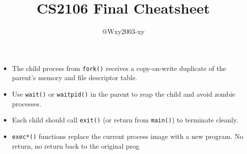 \documentclass[8pt,twocolumn]{article}
\begin{document}
\title{CS2106 Final Cheatsheet}
\author{@Wxy2003-xy}
\date{}
\maketitle
\begin{itemize}[leftmargin=2em]
    \setlength{\itemsep}{0pt} %
    \setlength{\parskip}{0pt}
    \item The child process from \texttt{fork()} receives a copy-on-write duplicate of the parent's memory and file descriptor table.
    \item Use \texttt{wait()} or \texttt{waitpid()} in the parent to reap the child and avoid zombie processes.
    \item Each child should call \texttt{exit()} (or return from \texttt{main()}) to terminate cleanly.
    \item \texttt{exec*()} functions replace the current process image with a new program. No return, no return back to the original prog
\end{itemize}
\begin{center}
\vspace{-1.0em}
\vspace{-0.6em}
\end{center}
\end{document}
